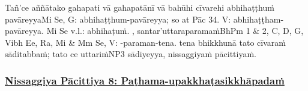 Tañ'ce aññātako gahapati vā gahapatānī vā bahūhi cīvarehi abhihaṭṭhuṁ pavāreyya\makeatletter\hyperlink{endnote-appendix}\makeatother Mi Se, G: abhihaṭṭhum-pavāreyya; so at Pāc 34. V: abhihaṭṭham-pavāreyya. Mi Se v.l.: abhihaṭuṁ. , santar'uttaraparamaṁ\makeatletter\hyperlink{endnote-appendix}\makeatother BhPm 1 & 2, C, D, G, Vibh Ee, Ra, Mi & Mm Se, V: -paraman-tena. tena bhikkhunā tato cīvaraṁ sāditabbaṁ; tato ce uttariṁ\makeatletter\hyperlink{endnote-appendix}\makeatother NP3 sādiyeyya, nissaggiyaṁ pācittiyaṁ.



\subsubsection*{\hyperref[forf-exp8]{Nissaggiya Pācittiya 8: Paṭhama-upakkhaṭasikkhāpadaṁ}}
\label{np8}

